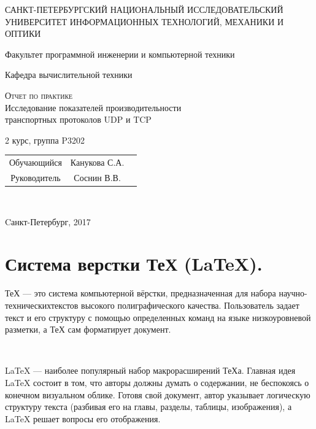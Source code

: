 \documentclass{article}
\begin{document}
\begin{titlepage}
  \begin{center}
    

    САНКТ-ПЕТЕРБУРГСКИЙ НАЦИОНАЛЬНЫЙ ИССЛЕДОВАТЕЛЬСКИЙ УНИВЕРСИТЕТ
ИНФОРМАЦИОННЫХ ТЕХНОЛОГИЙ, МЕХАНИКИ И ОПТИКИ
    \vspace{0.25cm}
    \vspace{0.25cm}
    
Факультет программной инженерии и компьютерной техники
    
    Кафедра вычислительной техники
    \vfill
  

    \textsc{Отчет по практике}\\[5mm]
    
    {\large Исследование показателей производительности\\
      транспортных протоколов UDP и TCP\\}
  \bigskip
    
    2 курс, группа P3202
\end{center}
\vfill

\normalsize{ 
\begin{tabular}{ccc}
Обучающийся & Канукова С.А. \\
Руководитель & Соснин В.В. \\
\end{tabular}
}\\

\begin{center}
Cанкт-Петербург, 2017
\end{center}
\end{titlepage}
 
\newpage

\tableofcontents

\newpage

\section{\textbf{\large Система верстки ТеХ (LaTeX).}}

ТеХ — это система компьютерной вёрстки, предназначенная для набора научно-техническихтекстов высокого полиграфического качества.
Пользователь задает текст и его структуру с помощью определенных команд на языке низкоуровневой разметки, а ТеХ сам форматирует документ.

~\

LaTeX — наиболее популярный набор макрорасширений ТеХа.
Главная идея LaTeX состоит в том, что авторы должны думать о содержании, не беспокоясь о конечном визуальном облике. Готовя свой документ, автор указывает логическую структуру текста (разбивая его на главы, разделы, таблицы, изображения), а LaTeX решает вопросы его отображения. 
\end{document}
